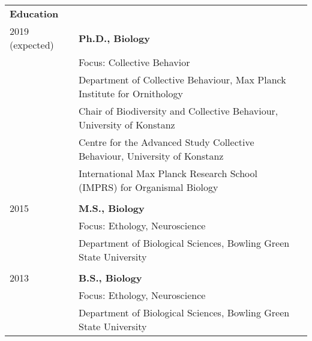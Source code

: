 \documentclass[letterpaper,10pt,oneside]{article}
\begin{document}
\noindent \begin{longtable}{@{} l p{5.3in}l}



\Large{\textbf{Education}} \vspace{5mm} \\
 \large{2019 (expected)} 
 & \textbf{Ph.D., Biology} \\
 & Focus: Collective Behavior \\
 & {Department of Collective Behaviour, Max Planck Institute for Ornithology} \\
  & {Chair of Biodiversity and Collective Behaviour, University of Konstanz} \\
    & {Centre for the Advanced Study Collective Behaviour, University of Konstanz} \\
 	& {International Max Planck Research School (IMPRS) for Organismal Biology} \\
     
     & \\
 \large{2015} 
  & \textbf{M.S., Biology} \\
 & Focus: Ethology, Neuroscience \\
     & {Department of Biological Sciences, Bowling Green State University} \\
    
     & \\
 \large{2013} 
  &\textbf{B.S., Biology} \\
 & Focus: Ethology, Neuroscience \\
      & {Department of Biological Sciences, Bowling Green State University} \\
    

\end{longtable}
\end{document}
